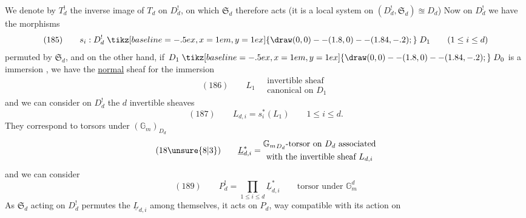 We denote by $T^!_d$ the inverse image of $T_d$ on $D^!_d$, on which $\mathfrak S_d$ therefore acts (it is a  local system on $(D^!_d,\mathfrak S_d)\approxeq D_d$) Now on $D^!_d$ we have the  morphisms
\[
(185)\qquad s_i:D^!_d\mathrel{\tikz[baseline=-.5ex,x=1em,y=1ex]{\draw (0,0)--(1.8,0)--(1.84,-.2);}}D_1\qquad(1\leq i\leq d)
\]
permuted by $\mathfrak S_d$, and on the other hand, if $D_1\mathrel{\tikz[baseline=-.5ex,x=1em,y=1ex]{\draw (0,0)--(1.8,0)--(1.84,-.2);}}D_0$ is a  immersion , we have  the \uline{normal} sheaf for the immersion
\[
(186)\qquad L_1\quad\begin{gathered}\text{invertible sheaf}\\\text{canonical on }D_1\end{gathered}
\]
and we can consider on $D^!_d$ the $d$ invertible sheaves
\[
(187)\qquad L_{d,i}=s_i^*(L_1)\qquad1\leq i\leq d.
\]
They correspond to torsors under $(\mathbb G_m)_{D_d}$
\[
(18\unsure{8|3})\qquad\underline L_{d,i}^*=\begin{gathered}{\mathbb G_m}_{D_d}\text{-torsor on }D_d\text{ associated}\\\text{with the invertible sheaf }L_{d,i}\end{gathered}
\]
and we can consider
\[
(189)\qquad P^!_d=\prod_{1\leq i\leq d}\underline L_{d,i}^*\qquad\text{torsor under }\mathbb G_m^d
\]
As $\mathfrak S_d$ acting on $D^!_d$ permutes the  $\underline L_{d,i}$ among themselves, it acts on $P_d$,    way compatible with its action on

